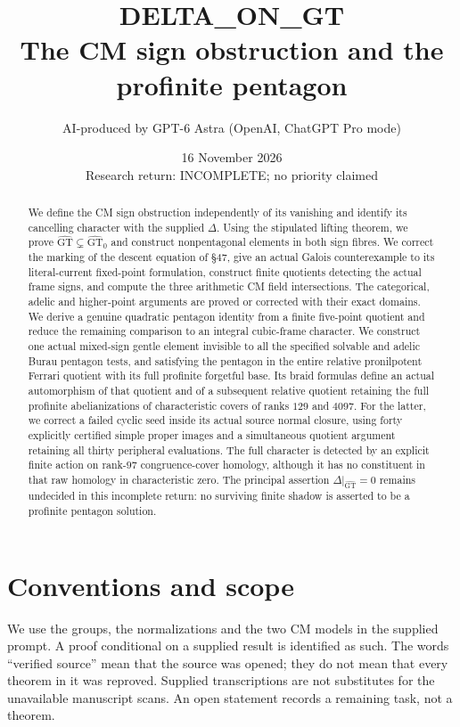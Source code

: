 \documentclass[11pt,a4paper]{article}
\title{DELTA\_ON\_GT\\The CM sign obstruction and the profinite pentagon}
\author{AI-produced by GPT-6 Astra (OpenAI, ChatGPT Pro mode)}
\date{16 November 2026\\Research return: INCOMPLETE; no priority claimed}
\begin{document}
\maketitle
\begin{abstract}
We define the CM sign obstruction independently of its vanishing and
identify its cancelling character with the supplied $\Delta$.
Using the stipulated lifting theorem, we prove
$\widehat{\mathrm{GT}}\subsetneq\widehat{\mathrm{GT}}_0$
and construct nonpentagonal elements in both sign fibres.
We correct the marking of the descent equation of \S47,
give an actual Galois counterexample to its literal-current
fixed-point formulation, construct finite quotients detecting
the actual frame signs, and compute the three arithmetic CM
field intersections. The categorical, adelic and higher-point
arguments are proved or corrected with their exact domains.
We derive a genuine quadratic pentagon identity from a finite
five-point quotient and reduce the remaining comparison to
an integral cubic-frame character. We construct one actual
mixed-sign gentle element invisible to all the specified
solvable and adelic Burau pentagon tests, and satisfying the
pentagon in the entire relative pronilpotent Ferrari quotient
with its full profinite forgetful base. Its braid formulas
define an actual automorphism of that quotient and of a
subsequent relative quotient retaining the full profinite
abelianizations of characteristic covers of ranks $129$ and $4097$.
For the latter, we correct a failed cyclic seed inside its actual
source normal closure, using forty explicitly certified simple
proper images and a simultaneous quotient argument retaining
all thirty peripheral evaluations.
The full character
is detected by an explicit finite action on rank-$97$
congruence-cover homology, although it has no constituent in
that raw homology in characteristic zero.
The principal assertion $\Delta|_{\widehat{\mathrm{GT}}}=0$
remains undecided in this incomplete return: no surviving
finite shadow is asserted to be a profinite pentagon solution.
\end{abstract}
\tableofcontents
\section*{Conventions and scope}
We use the groups, the normalizations and the two CM models in the supplied prompt. A proof conditional on a supplied result is identified as such. The words ``verified source'' mean that the source was opened; they do not mean that every theorem in it was reproved. Supplied transcriptions are not substitutes for the unavailable manuscript scans. An open statement records a remaining task, not a theorem.

\end{document}
